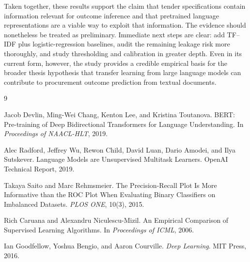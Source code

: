 \documentclass[conference]{IEEEtran}
\begin{document}
Taken together, these results support the claim that tender specifications contain information relevant for outcome inference and that pretrained language representations are a viable way to exploit that information. The evidence should nonetheless be treated as preliminary. Immediate next steps are clear: add TF--IDF plus logistic-regression baselines, audit the remaining leakage risk more thoroughly, and study thresholding and calibration in greater depth. Even in its current form, however, the study provides a credible empirical basis for the broader thesis hypothesis that transfer learning from large language models can contribute to procurement outcome prediction from textual documents.

\begin{thebibliography}{9}

Jacob Devlin, Ming-Wei Chang, Kenton Lee, and Kristina Toutanova.
\newblock BERT: Pre-training of Deep Bidirectional Transformers for Language Understanding.
\newblock In \emph{Proceedings of NAACL-HLT}, 2019.

Alec Radford, Jeffrey Wu, Rewon Child, David Luan, Dario Amodei, and Ilya Sutskever.
\newblock Language Models are Unsupervised Multitask Learners.
\newblock OpenAI Technical Report, 2019.

Takaya Saito and Marc Rehmsmeier.
\newblock The Precision-Recall Plot Is More Informative than the ROC Plot When Evaluating Binary Classifiers on Imbalanced Datasets.
\newblock \emph{PLOS ONE}, 10(3), 2015.

Rich Caruana and Alexandru Niculescu-Mizil.
\newblock An Empirical Comparison of Supervised Learning Algorithms.
\newblock In \emph{Proceedings of ICML}, 2006.

Ian Goodfellow, Yoshua Bengio, and Aaron Courville.
\newblock \emph{Deep Learning}.
\newblock MIT Press, 2016.

\end{thebibliography}
\end{document}
